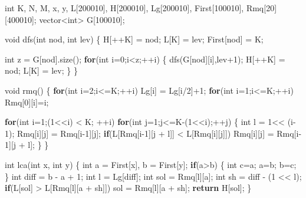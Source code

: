 \documentclass[10pt,]{article}
\newenvironment{Shaded}{}{}
\newcommand{\KeywordTok}[1]{\textcolor[rgb]{0.00,0.44,0.13}{\textbf{{#1}}}}
\newcommand{\DataTypeTok}[1]{\textcolor[rgb]{0.56,0.13,0.00}{{#1}}}
\newcommand{\DecValTok}[1]{\textcolor[rgb]{0.25,0.63,0.44}{{#1}}}
\newcommand{\NormalTok}[1]{{#1}}
\begin{document}
\begin{Shaded}
\begin{Highlighting}[]
\DataTypeTok{int} \NormalTok{K, N, M, x, y, L[}\DecValTok{200010}\NormalTok{], H[}\DecValTok{200010}\NormalTok{], Lg[}\DecValTok{200010}\NormalTok{], First[}\DecValTok{100010}\NormalTok{], Rmq[}\DecValTok{20}\NormalTok{][}\DecValTok{400010}\NormalTok{];}
\NormalTok{vector<}\DataTypeTok{int}\NormalTok{> G[}\DecValTok{100010}\NormalTok{];}

\DataTypeTok{void} \NormalTok{dfs(}\DataTypeTok{int} \NormalTok{nod, }\DataTypeTok{int} \NormalTok{lev)}
\NormalTok{\{}
  \NormalTok{H[++K] = nod;}
  \NormalTok{L[K] = lev;}
  \NormalTok{First[nod] = K;}

  \DataTypeTok{int} \NormalTok{z = G[nod].size();}
  \KeywordTok{for}\NormalTok{(}\DataTypeTok{int} \NormalTok{i=}\DecValTok{0}\NormalTok{;i<z;++i)}
  \NormalTok{\{}
    \NormalTok{dfs(G[nod][i],lev}\DecValTok{+1}\NormalTok{);}
    \NormalTok{H[++K] = nod;}
    \NormalTok{L[K] = lev;}
  \NormalTok{\}}
\NormalTok{\}}

\DataTypeTok{void} \NormalTok{rmq()}
\NormalTok{\{}
  \KeywordTok{for}\NormalTok{(}\DataTypeTok{int} \NormalTok{i=}\DecValTok{2}\NormalTok{;i<=K;++i)}
    \NormalTok{Lg[i] = Lg[i/}\DecValTok{2}\NormalTok{]+}\DecValTok{1}\NormalTok{;}
  \KeywordTok{for}\NormalTok{(}\DataTypeTok{int} \NormalTok{i=}\DecValTok{1}\NormalTok{;i<=K;++i)}
    \NormalTok{Rmq[}\DecValTok{0}\NormalTok{][i]=i;}

  \KeywordTok{for}\NormalTok{(}\DataTypeTok{int} \NormalTok{i=}\DecValTok{1}\NormalTok{;(}\DecValTok{1}\NormalTok{<<i) < K; ++i)}
    \KeywordTok{for}\NormalTok{(}\DataTypeTok{int} \NormalTok{j=}\DecValTok{1}\NormalTok{;j<=K-(}\DecValTok{1}\NormalTok{<<i);++j)}
    \NormalTok{\{}
      \DataTypeTok{int} \NormalTok{l = }\DecValTok{1}\NormalTok{<< (i}\DecValTok{-1}\NormalTok{);}
      \NormalTok{Rmq[i][j] = Rmq[i}\DecValTok{-1}\NormalTok{][j];}
      \KeywordTok{if}\NormalTok{(L[Rmq[i}\DecValTok{-1}\NormalTok{][j + l]] < L[Rmq[i][j]])}
        \NormalTok{Rmq[i][j] = Rmq[i}\DecValTok{-1}\NormalTok{][j + l];}
    \NormalTok{\}}
\NormalTok{\}}

\DataTypeTok{int} \NormalTok{lca(}\DataTypeTok{int} \NormalTok{x, }\DataTypeTok{int} \NormalTok{y)}
\NormalTok{\{}
  \DataTypeTok{int} \NormalTok{a = First[x], b = First[y];}
  \KeywordTok{if}\NormalTok{(a>b)}
  \NormalTok{\{}
    \DataTypeTok{int} \NormalTok{c=a;}
    \NormalTok{a=b;}
    \NormalTok{b=c;}
  \NormalTok{\}}
  \DataTypeTok{int} \NormalTok{diff = b - a + }\DecValTok{1}\NormalTok{;}
  \DataTypeTok{int} \NormalTok{l = Lg[diff];}
  \DataTypeTok{int} \NormalTok{sol = Rmq[l][a];}
  \DataTypeTok{int} \NormalTok{sh = diff - (}\DecValTok{1} \NormalTok{<< l);}
  \KeywordTok{if}\NormalTok{(L[sol] > L[Rmq[l][a + sh]])}
    \NormalTok{sol = Rmq[l][a + sh];}
  \KeywordTok{return} \NormalTok{H[sol];}
\NormalTok{\}}
\end{Highlighting}
\end{Shaded}
\end{document}
